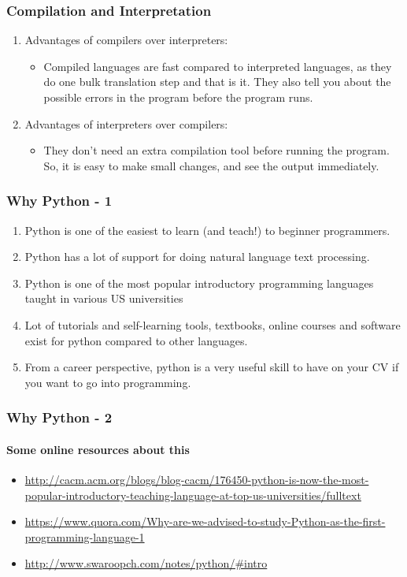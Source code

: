 \documentclass{beamer}
\begin{document}
\begin{frame}%
\frametitle{Compilation and Interpretation}
\begin{enumerate}
\item Advantages of compilers over interpreters:
\begin{itemize}
\item Compiled languages are fast compared to interpreted languages, as they do one bulk translation step and that is it. They also tell you about the possible errors in the program before the program runs. 
\end{itemize}
\pause \item Advantages of interpreters over compilers: 
\begin{itemize}
\item They don't need an extra compilation tool before running the program. So, it is easy to make small changes, and see the output immediately.
\end{itemize}
\end{enumerate}
\end{frame}
\begin{frame}%
\frametitle{Why Python - 1}
\begin{enumerate}
\item Python is one of the easiest to learn (and teach!) to beginner programmers.
\item Python has a lot of support for doing natural language text processing.
\item Python is one of the most popular introductory programming languages taught in various US universities
\item Lot of tutorials and self-learning tools, textbooks, online courses and software exist for python compared to other languages.
\item From a career perspective, python is a very useful skill to have on your CV if you want to go into programming. 
\end{enumerate}
\end{frame}

\begin{frame}
\frametitle{Why Python - 2}
\framesubtitle{Some online resources about this}
\begin{itemize}
\item \url{http://cacm.acm.org/blogs/blog-cacm/176450-python-is-now-the-most-popular-introductory-teaching-language-at-top-us-universities/fulltext}
\item \url{https://www.quora.com/Why-are-we-advised-to-study-Python-as-the-first-programming-language-1}
\item \url{http://www.swaroopch.com/notes/python/\#intro}
\end{itemize}
\end{frame}
\end{document}
